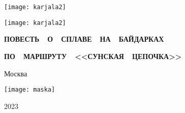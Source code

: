 \begin{titlepage}
	\newpage
	\begin{center}
		\Large \textbf \MyVarAuthorName
	\end{center}	
	\vspace{0.75cm}	
	\begin{center}
	\texttt{[image: karjala2]}%
	\end{center}	
	\begin{center}
		\Huge{}
	\end{center}	
%
	\begin{center}
	\texttt{[image: karjala2]}%
	\end{center}
%
	\begin{center}
		\footnotesize
%	
		{
		\textbf{ПОВЕСТЬ~~О~~СПЛАВЕ~~НА~~БАЙДАРКАХ}}
		
		{
		\textbf{ПО~~МАРШРУТУ~~<<СУНСКАЯ~~ЦЕПОЧКА>>}}		
	\end{center}
%
	\vspace{\fill}	
	\begin{center}\normalsize Москва\end{center}
	\vspace{-1.1cm}
	\begin{center}\texttt{[image: maska]}\end{center}
	\vspace{-1.24cm}
	\begin{center}\normalsize 2023\end{center}	
\end{titlepage}